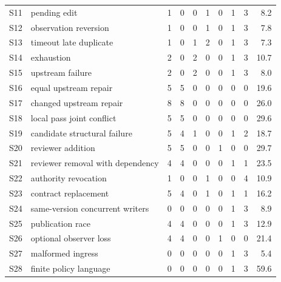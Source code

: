 \documentclass[pdflatex,sn-mathphys-num]{sn-jnl}
\theoremstyle{thmstyleone}
\theoremstyle{thmstylethree}
\theoremstyle{thmstyletwo}
\begin{document}
{\begin{longtable}{@{}lp{3.0cm}rrrrrrrr@{}}
S11 & pending edit & 1 & 0 & 0 & 1 & 0 & 1 & 3 & 8.2\\

S12 & observation reversion & 1 & 0 & 0 & 1 & 0 & 1 & 3 & 7.8\\

S13 & timeout late duplicate & 1 & 0 & 1 & 2 & 0 & 1 & 3 & 7.3\\

S14 & exhaustion & 2 & 0 & 2 & 0 & 0 & 1 & 3 & 10.7\\

S15 & upstream failure & 2 & 0 & 2 & 0 & 0 & 1 & 3 & 8.0\\

S16 & equal upstream repair & 5 & 5 & 0 & 0 & 0 & 0 & 0 & 19.6\\

S17 & changed upstream repair & 8 & 8 & 0 & 0 & 0 & 0 & 0 & 26.0\\

S18 & local pass joint conflict & 5 & 5 & 0 & 0 & 0 & 0 & 0 & 29.6\\

S19 & candidate structural failure & 5 & 4 & 1 & 0 & 0 & 1 & 2 & 18.7\\

S20 & reviewer addition & 5 & 5 & 0 & 0 & 1 & 0 & 0 & 29.7\\

S21 & reviewer removal with dependency & 4 & 4 & 0 & 0 & 0 & 1 & 1 & 23.5\\

S22 & authority revocation & 1 & 0 & 0 & 1 & 0 & 0 & 4 & 10.9\\

S23 & contract replacement & 5 & 4 & 0 & 1 & 0 & 1 & 1 & 16.2\\

S24 & same-version concurrent writers & 0 & 0 & 0 & 0 & 0 & 1 & 3 & 8.9\\

S25 & publication race & 4 & 4 & 0 & 0 & 0 & 1 & 3 & 12.9\\

S26 & optional observer loss & 4 & 4 & 0 & 0 & 1 & 0 & 0 & 21.4\\

S27 & malformed ingress & 0 & 0 & 0 & 0 & 0 & 1 & 3 & 5.4\\

S28 & finite policy language & 0 & 0 & 0 & 0 & 0 & 1 & 3 & 59.6\\

\end{longtable}}
\end{document}
